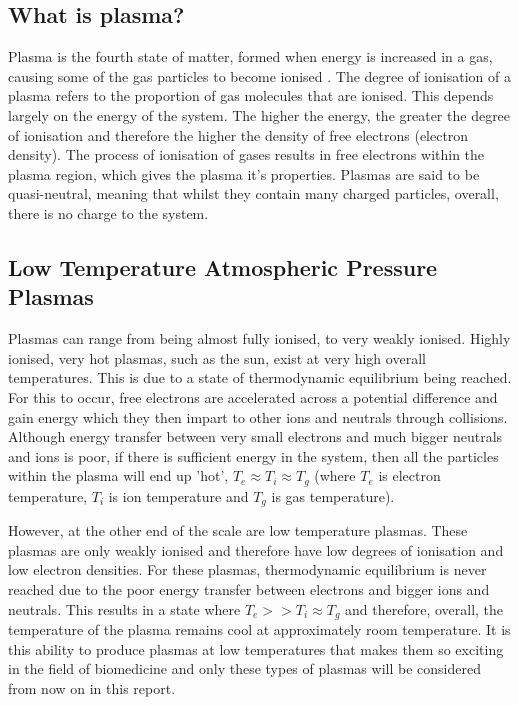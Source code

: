 \documentclass[11pt, oneside]{article}   	%
\begin{document}
\subsection{What is plasma?}
Plasma is the fourth state of matter, formed when energy is increased in a gas, causing some of the gas particles to become ionised \cite{Fridman2013PlasmaMedicine}. 
The degree of ionisation of a plasma refers to the proportion of gas molecules that are ionised.
This depends largely on the energy of the system. 
The higher the energy, the greater the degree of ionisation and therefore the higher the density of free electrons (electron density).
The process of ionisation of gases results in free electrons within the plasma region, which gives the plasma it's properties.
Plasmas are said to be quasi-neutral, meaning that whilst they contain many charged particles, overall, there is no charge to the system.

\subsection{Low Temperature Atmospheric Pressure Plasmas} \label{section:LowTempPlasmas}

Plasmas can range from being almost fully ionised, to very weakly ionised.
Highly ionised, very hot plasmas, such as the sun, exist at very high overall temperatures. 
This is due to a state of thermodynamic equilibrium being reached. 
For this to occur, free electrons are accelerated across a potential difference and gain energy which they then impart to other ions and neutrals through collisions.
Although energy transfer between very small electrons and much bigger neutrals and ions is poor, if there is sufficient energy in the system, then all the particles within the plasma will end up 'hot', $T_e \approx T_i \approx T_g$ (where $T_e$ is electron temperature, $T_i$ is ion temperature and $T_g$ is gas temperature).

However, at the other end of the scale are low temperature plasmas. 
These plasmas are only weakly ionised and therefore have low degrees of ionisation and low electron densities.
For these plasmas, thermodynamic equilibrium is never reached due to the poor energy transfer between electrons and bigger ions and neutrals. 
This results in a state where $T_e >> T_i \approx T_g$ and therefore, overall, the temperature of the plasma remains cool at approximately room temperature.
It is this ability to produce plasmas at low temperatures that makes them so exciting in the field of biomedicine and only these types of plasmas will be considered from now on in this report.
\end{document}
